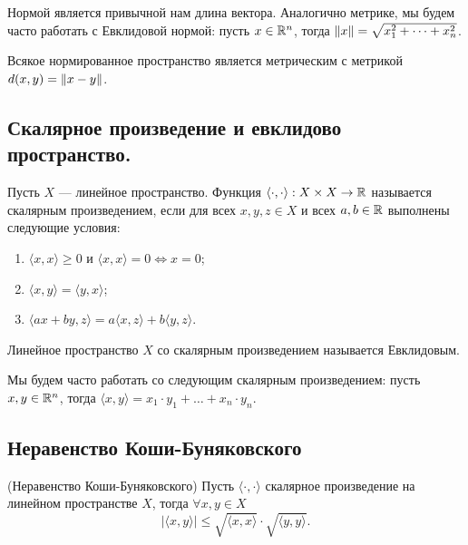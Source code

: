 \documentclass[a4paper]{article}
\theoremstyle{named}
\begin{document}
    Нормой является привычной нам длина вектора. Аналогично метрике, мы будем часто работать с Евклидовой нормой: пусть $x \in \mathbb{R}^n$, тогда $\left\lVert x\right\rVert = \sqrt{x_1^2 + \dots + x_n^2}$.

    Всякое нормированное пространство является метрическим с метрикой $d(x, y) = \left\lVert x - y\right\rVert$.

    \subsection{Скалярное произведение и евклидово пространство.}

    \begin{definition*}
        Пусть $X$ --- линейное пространство. Функция $\langle \cdot, \cdot \rangle: X \times X \to \mathbb{R}$ называется скалярным произведением, если для всех $x, y, z \in X$ и всех $a, b \in \mathbb{R}$ выполнены следующие условия:
        \begin{enumerate}
        \item $\langle x, x \rangle \geq 0$ и $\langle x, x \rangle = 0 \iff x = 0$;
        \item $\langle x, y \rangle = \langle y, x \rangle$;
        \item $\langle ax + by, z \rangle = a \langle x, z \rangle + b \langle y, z \rangle$.
        \end{enumerate}

        Линейное пространство $X$ со скалярным произведением называется Евклидовым.
    \end{definition*}

    Мы будем часто работать со следующим скалярным произведением: пусть $x, y \in \mathbb{R}^n$, тогда $\langle x, y \rangle = x_1 \cdot y_1 + \dots + x_n \cdot y_n$.

    \subsection{Неравенство Коши-Буняковского}

    \begin{lemma*} (Неравенство Коши-Буняковского) 
        Пусть $\langle \cdot, \cdot \rangle$ скалярное произведение на линейном пространстве $X$, тогда $\forall x, y \in X$
        \begin{equation*}
            |\langle x, y \rangle| \leq \sqrt{\langle x, x \rangle} \cdot \sqrt{\langle y, y \rangle}.
        \end{equation*}
    \end{lemma*}
\end{document}
